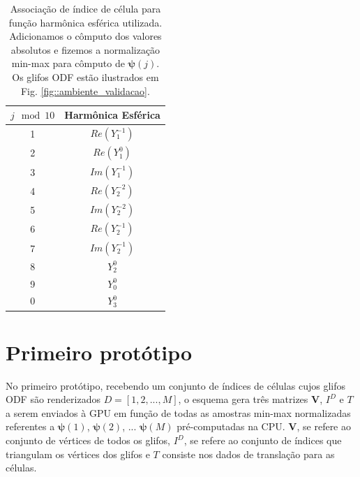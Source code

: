 \documentclass[
    12pt,                %
    oneside,            %
    a4paper,            %
    english,            %
    french,                %
    spanish,            %
    brazil                %
    ]{abntex2}
\begin{document}
\begin{table}[]
\centering
\begin{tabular}{cc}
$j \mod 10$ & Harmônica Esférica \\ \hline
1 & $Re(Y_1^{-1})$  \\
2 & $Re(Y_1^0)$     \\
3 & $Im(Y_1^{-1})$  \\
4 & $Re(Y_2^{-2})$  \\
5 & $Im(Y_2^{-2})$  \\
6 & $Re(Y_2^{-1})$  \\
7 & $Im(Y_2^{-1})$  \\
8 & $Y_2^0$         \\
9 & $Y_0^0$         \\
0 & $Y_3^0$        
\end{tabular}
\caption{Associação de índice de célula para função harmônica esférica utilizada. Adicionamos o cômputo dos valores absolutos e fizemos a normalização min-max para cômputo de $\boldsymbol{\psi}(j)$. Os glifos ODF estão ilustrados em Fig. \ref{fig::ambiente_validacao}.}
\label{tab::harmonicas_esfericas}
\end{table}




\section{Primeiro protótipo}
\label{sec::primeiro_prototipo}

No primeiro protótipo, recebendo um conjunto de índices de células cujos glifos ODF são renderizados $D = [
1,
2, ..., 
M
]$, o esquema gera três matrizes $\mathbf{V}$, $I^D$ e $T$ a serem enviados à GPU em função de todas as amostras min-max normalizadas referentes a
$\boldsymbol{\psi}(1)$,
$\boldsymbol{\psi}(2)$, ...
$\boldsymbol{\psi}(M)$ pré-computadas na CPU. $\mathbf{V}$, se refere ao conjunto de vértices de todos os glifos, $I^D$, se refere ao conjunto de índices que triangulam os vértices dos glifos e $T$ consiste nos dados de translação para as células.


\end{document}
